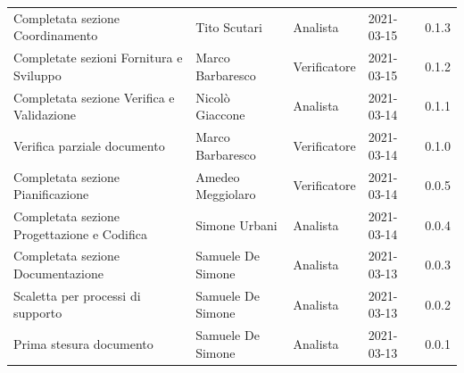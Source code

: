 \documentclass[a4paper]{article}
\begin{document}
\begin{center}
\begin{table}[h!]
\begin{tabular}{p{160px} p{86px} p{70px} p{60px} p{45px}}
            Completata sezione Coordinamento            & Tito Scutari                                & Analista       & 2021-03-15    & 0.1.3             \\
            Completate sezioni Fornitura e Sviluppo     & Marco Barbaresco                            & Verificatore   & 2021-03-15    & 0.1.2             \\
            Completata sezione Verifica e Validazione   & Nicolò Giaccone                             & Analista       & 2021-03-14    & 0.1.1             \\
            Verifica parziale documento                 & Marco Barbaresco                            & Verificatore   & 2021-03-14    & 0.1.0             \\
            Completata sezione Pianificazione           & Amedeo Meggiolaro                           & Verificatore   & 2021-03-14    & 0.0.5             \\
            Completata sezione Progettazione e Codifica & Simone Urbani                               & Analista       & 2021-03-14    & 0.0.4             \\
            Completata sezione Documentazione           & Samuele De Simone                           & Analista       & 2021-03-13    & 0.0.3             \\
            Scaletta per processi di supporto           & Samuele De Simone                           & Analista       & 2021-03-13    & 0.0.2             \\
            Prima stesura documento                     & Samuele De Simone                           & Analista       & 2021-03-13    & 0.0.1             \\
        \end{tabular}
    \end{table}
\end{center}
\newpage
\tableofcontents
\newpage





\end{document}
